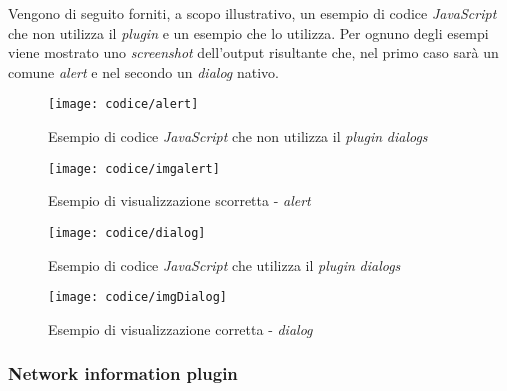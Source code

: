 Vengono di seguito forniti, a scopo illustrativo, un esempio di codice \textit{JavaScript} che non utilizza il \textit{plugin} e un esempio che lo utilizza. Per ognuno degli esempi viene mostrato uno \textit{screenshot} dell'output risultante che, nel primo caso sarà un comune \textit{alert} e nel secondo un \textit{dialog} nativo.

\begin{figure}[!h] 
    \centering 
    \texttt{[image: codice/alert]} 
    \caption{Esempio di codice \textit{JavaScript} che non utilizza il \textit{plugin} \textit{dialogs}}
\end{figure}

\newpage

\begin{figure}[!h] 
    \centering 
    \texttt{[image: codice/imgalert]} 
    \caption{Esempio di visualizzazione scorretta - \textit{alert}}
\end{figure}

\begin{figure}[!h] 
    \centering 
    \texttt{[image: codice/dialog]} 
    \caption{Esempio di codice \textit{JavaScript} che utilizza il \textit{plugin} \textit{dialogs}}
\end{figure}

\begin{figure}[!h] 
    \centering 
    \texttt{[image: codice/imgDialog]} 
    \caption{Esempio di visualizzazione corretta - \textit{dialog}}
\end{figure}

\subsubsection{Network information plugin}

